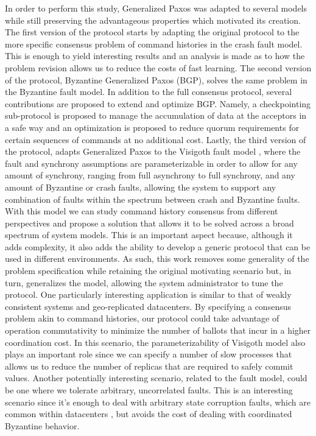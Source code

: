 In order to perform this study, Generalized Paxos was adapted to several models while still preserving the advantageous properties which motivated its creation. The first version of the protocol starts by adapting the original protocol to the more specific consensus problem of command histories in the crash fault model. This is enough to yield interesting results and an analysis is made as to how the problem revision allows us to reduce the costs of fast learning. The second version of the protocol, Byzantine Generalized Paxos (BGP), solves the same problem in the Byzantine fault model. In addition to the full consensus protocol, several contributions are proposed to extend and optimize BGP. Namely, a checkpointing sub-protocol is proposed to manage the accumulation of data at the acceptors in a safe way and an optimization is proposed to reduce quorum requirements for certain sequences of commands at no additional cost. Lastly, the third version of the protocol, adapts Generalized Paxos to the Visigoth fault model \cite{Porto2015}, where the fault and synchrony assumptions are parameterizable in order to allow for any amount of synchrony, ranging from full asynchrony to full synchrony, and any amount of Byzantine or crash faults, allowing the system to support any combination of faults within the spectrum between crash and Byzantine faults. With this model we can study command history consensus from different perspectives and propose a solution that allows it to be solved across a broad spectrum of system models. This is an important aspect because, although it adds complexity, it also adds the ability to develop a generic protocol that can be used in different environments. As such, this work removes some generality of the problem specification while retaining the original motivating scenario but, in turn, generalizes the model, allowing the system administrator to tune the protocol.  One particularly interesting application is similar to that of weakly consistent systems and geo-replicated datacenters. By specifying a consensus problem akin to command histories, our protocol could take advantage of operation commutativity to minimize the number of ballots that incur in a higher coordination cost. In this scenario, the parameterizability of Visigoth model also plays an important role since we can specify a number of slow processes that allows us to reduce the number of replicas that are required to safely commit values. Another potentially interesting scenario, related to the fault model, could be one where we tolerate arbitrary, uncorrelated faults. This is an interesting scenario since it's enough to deal with arbitrary state corruption faults, which are common within datacenters \cite{AmazonS32}, but avoids the cost of dealing with coordinated Byzantine behavior.\par 


